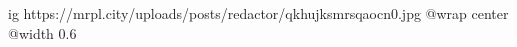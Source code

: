  
 
 
 
 

\ifcmt
  ig https://mrpl.city/uploads/posts/redactor/qkhujksmrsqaocn0.jpg
  @wrap center
  @width 0.6
\fi
